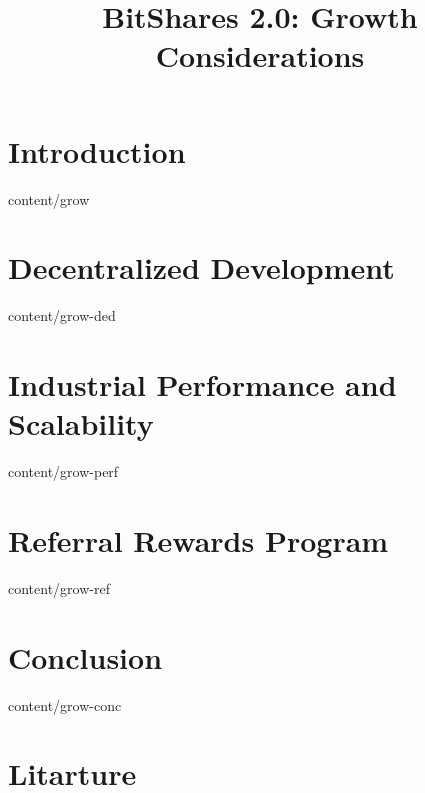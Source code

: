 \documentclass[conference,final,10pt,a4paper]{IEEEtran}
\title{BitShares 2.0: Growth Considerations}
\author{}
\begin{document}
\sloppy
\maketitle

\begin{abstract}
\end{abstract}
\section  { Introduction                           }  { content/grow      } 
\section  { Decentralized Development              }  { content/grow-ded  } 
\section  { Industrial Performance and Scalability }  { content/grow-perf } 
\section  { Referral Rewards Program               }  { content/grow-ref  } 
\section  { Conclusion                             }  { content/grow-conc } 
\section* { Litarture                              } 
\end{document}
